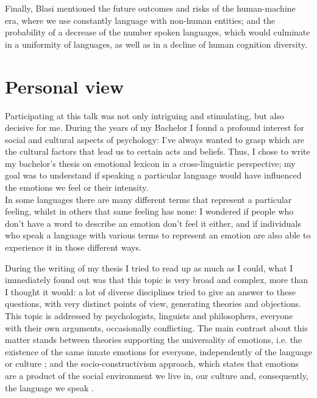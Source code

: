 Finally, Blasi mentioned the future outcomes and risks of the human-machine era, where we use constantly language with non-human entities; and the probability of a decrease of the number spoken languages, which would culminate in a uniformity of languages, as well as in a decline of human cognition diversity.

\section*{Personal view}
Participating at this talk was not only intriguing and stimulating, but also decisive for me. During the years of my Bachelor I found a profound interest for social and cultural aspects of psychology: I've always wanted to grasp which are the cultural factors that lead us to certain acts and beliefs. Thus, I chose to write my bachelor's thesis on emotional lexicon in a cross-linguistic perspective; my goal was to understand if speaking a particular language would have influenced the emotions we feel or their intensity. \\
In some languages there are many different terms that represent a particular feeling, whilst in others that same feeling has none: I wondered if people who don't have a word to describe an emotion don't feel it either, and if individuals who speak a language with various terms to represent an emotion are also able to experience it in those different ways.

During the writing of my thesis I tried to read up as much as I could, what I immediately found out was that this topic is very broad and complex, more than I thought it would: a lot of diverse disciplines tried to give an answer to these questions, with very distinct points of view, generating theories and objections. \\
This topic is addressed by psychologists, linguists and philosophers, everyone with their own arguments, occasionally conflicting. The main contrast about this matter stands between theories supporting the universality of emotions, i.e. the existence of the same innate emotions for everyone, independently of the language or culture \parencite[for example]{Izard_2010}; and the socio-constructivism approach, which states that emotions are a product of the social environment we live in, our culture and, consequently, the language we speak \parencite[for example]{Barbara_1996}. 

